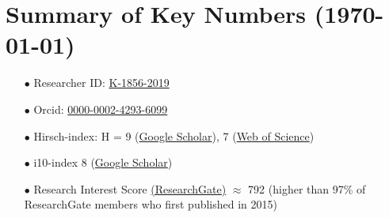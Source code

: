 \documentclass[11pt,a4paper,roman,english,colorlinks,linkcolor={red!50!black}]{moderncv}
\begin{document}
\section{\textbf{Summary of Key Numbers (\today)}}
\begin{enumerate}[leftmargin=0.75cm]
	\item[$\bullet$] Researcher ID: \href{https://www.webofscience.com/wos/author/record/K-1856-2019}{K-1856-2019}
	\item[$\bullet$] Orcid: \href{https://orcid.org/0000-0002-4293-6099}{0000-0002-4293-6099}
	\item[$\bullet$] Hirsch-index: H = 9 (\href{https://scholar.google.com/citations?hl=en&user=67aQviYAAAAJ}{Google Scholar}), 7 (\href{https://www.webofscience.com/wos/author/record/K-1856-2019}{Web of Science})
	\item[$\bullet$] i10-index 8 (\href{https://scholar.google.com/citations?hl=en&user=67aQviYAAAAJ}{Google Scholar})
	\item[$\bullet$] Research Interest Score \href{https://www.researchgate.net/profile/Vatsal-Sanjay-2}{(ResearchGate)} $\approx$ 792 (higher than 97\% of ResearchGate members who first published in 2015)
\end{enumerate}
\end{document}
